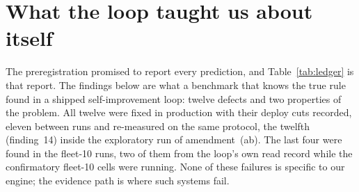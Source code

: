 \documentclass[11pt]{article}
\begin{document}
\section{What the loop taught us about itself}
\label{sec:findings}

The preregistration promised to report every prediction, and Table~\ref{tab:ledger} is that
report. The findings below are what a benchmark that knows the true rule found in a shipped
self-improvement loop: twelve defects and two properties of the problem. All twelve were fixed
in production with their deploy cuts recorded, eleven between runs and re-measured on the same
protocol, the twelfth (finding~14) inside the exploratory run of amendment~(ab). The last four
were found in the fleet-10 runs, two of them from the loop's own read record while the
confirmatory fleet-10 cells were running. None of these failures is specific to our engine; the
evidence path is where such systems fail.
\end{document}
